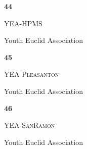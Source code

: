 \documentclass[extrafontsizes,30pt]{memoir}
\begin{document}
\renewcommand{\TeamID}{44}
\renewcommand{\TeamName}{YEA-HPMS}
\renewcommand{\SchoolName}{Youth Euclid Association}

\begin{center}
\mbox{}
\vspace{1in}

{\Huge \textbf{ \TeamID}}

\vspace{1in}

{\Large \textsc{\TeamName}}

\vspace{1in}

{\large \SchoolName}
\end{center}

\newpage



\renewcommand{\TeamID}{45}
\renewcommand{\TeamName}{YEA-Pleasanton}
\renewcommand{\SchoolName}{Youth Euclid Association}

\begin{center}
\mbox{}
\vspace{1in}

{\Huge \textbf{ \TeamID}}

\vspace{1in}

{\Large \textsc{\TeamName}}

\vspace{1in}

{\large \SchoolName}
\end{center}

\newpage



\renewcommand{\TeamID}{46}
\renewcommand{\TeamName}{YEA-SanRamon}
\renewcommand{\SchoolName}{Youth Euclid Association}

\begin{center}
\mbox{}
\vspace{1in}

{\Huge \textbf{ \TeamID}}

\vspace{1in}

{\Large \textsc{\TeamName}}

\vspace{1in}

{\large \SchoolName}
\end{center}

\newpage



\renewcommand{\TeamID}{47}
\renewcommand{\TeamName}{YEA-Youth}
\renewcommand{\SchoolName}{Youth Euclid Association}
\end{document}
